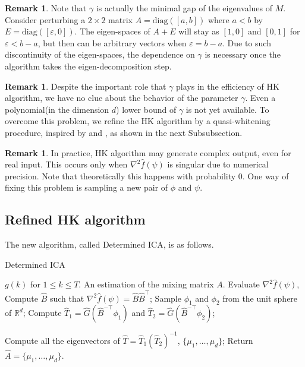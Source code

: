 \documentclass[twoside]{article}
\newcommand{\real}{\mathbb{R}}
\theoremstyle{definition}
\newtheorem{remark}[lemma]{Remark}
\newcommand{\eps}{\varepsilon}
\begin{document}
\begin{remark}
Note that $\gamma$ is actually the minimal gap of the eigenvalues of $M$.
Consider perturbing a $2\times 2$ matrix $A = \text{diag}([a,b])$ where $a<b$ by $E = \text{diag}([\eps,0])$. 
The eigen-spaces of $A+E$ will stay as $[1,0]$ and $[0,1]$ for $\eps < b-a$, but then can be arbitrary vectors when $\eps = b-a$.  
Due to such discontinuity of the eigen-spaces, the dependence on $\gamma$ is necessary once the algorithm takes the eigen-decomposition step. 
\end{remark}
\begin{remark}
Despite the important role that $\gamma$ plays in the efficiency of HK algorithm, we have no clue about the behavior of the parameter $\gamma$. Even a polynomial(in the dimension $d$) lower bound of $\gamma$ is not yet available. 
To overcome this problem, we refine the HK algorithm by a quasi-whitening procedure, inspired by \citep{arora2012provable} and \citep{frieze1996learning}, as shown in the next Subsubsection.
\end{remark}
\begin{remark}
In practice, HK algorithm may generate complex output, even for real input. This occurs only when $\nabla^2\widehat{f}(\psi)$ is singular due to numerical precision. Note that theoretically this happens with probability 0. One way of fixing this problem is sampling a new pair of $\phi$ and $\psi$.
\end{remark}

\subsection{Refined HK algorithm}
\label{subsec:DICA}
The new algorithm, called Determined ICA, is as follows. 
\begin{algorithm}[H]
\caption{Determined ICA}
\begin{algorithmic}[1]
\INPUT $g(k)$ for $1\le k \le T$. 
\OUTPUT An estimation of the mixing matrix $A$. 
\STATE Evaluate $\nabla^2\widehat{f}(\psi)$, \\
\STATE Compute $\widehat{B}$ such that $\nabla^2\widehat{f}(\psi) = \widehat{B}\widehat{B}^{\top}$;
\STATE Sample $\phi_1$ and $\phi_2$ from the unit sphere of $\real^d$;
\STATE Compute $\widehat{T}_1 = \widehat{G}(\widehat{B}^{-\top}\phi_1)$ and  $\widehat{T}_2 =\widehat{G}(\widehat{B}^{-\top}\phi_2)$;

\STATE Compute all the eigenvectors of $\widehat{T} = \widehat{T}_1\left(\widehat{T}_2\right)^{-1}$, $\{\mu_1,\ldots,\mu_d\}$;
\STATE Return $\widehat{A} = \{\mu_1,\ldots,\mu_d\}$.
\end{algorithmic}
\end{algorithm}
\end{document}
